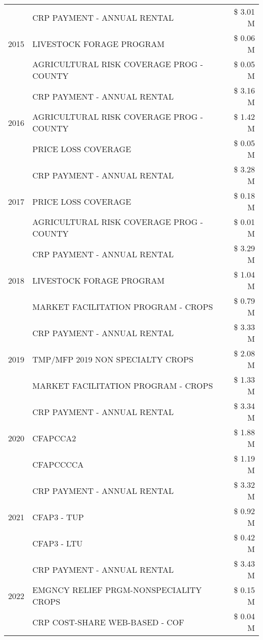 \begin{tabular}{llr}
\cline{1-3}
\multirow[t]{3}{*}{2015} & CRP PAYMENT - ANNUAL RENTAL & \$ 3.01 M \\
 & LIVESTOCK FORAGE PROGRAM & \$ 0.06 M \\
 & AGRICULTURAL RISK COVERAGE PROG - COUNTY & \$ 0.05 M \\
\cline{1-3}
\multirow[t]{3}{*}{2016} & CRP PAYMENT - ANNUAL RENTAL & \$ 3.16 M \\
 & AGRICULTURAL RISK COVERAGE PROG - COUNTY & \$ 1.42 M \\
 & PRICE LOSS COVERAGE & \$ 0.05 M \\
\cline{1-3}
\multirow[t]{3}{*}{2017} & CRP PAYMENT - ANNUAL RENTAL & \$ 3.28 M \\
 & PRICE LOSS COVERAGE & \$ 0.18 M \\
 & AGRICULTURAL RISK COVERAGE PROG - COUNTY & \$ 0.01 M \\
\cline{1-3}
\multirow[t]{3}{*}{2018} & CRP PAYMENT - ANNUAL RENTAL & \$ 3.29 M \\
 & LIVESTOCK FORAGE PROGRAM & \$ 1.04 M \\
 & MARKET FACILITATION PROGRAM - CROPS & \$ 0.79 M \\
\cline{1-3}
\multirow[t]{3}{*}{2019} & CRP PAYMENT - ANNUAL RENTAL & \$ 3.33 M \\
 & TMP/MFP 2019 NON SPECIALTY CROPS & \$ 2.08 M \\
 & MARKET FACILITATION PROGRAM - CROPS & \$ 1.33 M \\
\cline{1-3}
\multirow[t]{3}{*}{2020} & CRP PAYMENT - ANNUAL RENTAL & \$ 3.34 M \\
 & CFAPCCA2 & \$ 1.88 M \\
 & CFAPCCCCA & \$ 1.19 M \\
\cline{1-3}
\multirow[t]{3}{*}{2021} & CRP PAYMENT - ANNUAL RENTAL & \$ 3.32 M \\
 & CFAP3 - TUP & \$ 0.92 M \\
 & CFAP3 - LTU & \$ 0.42 M \\
\cline{1-3}
\multirow[t]{3}{*}{2022} & CRP PAYMENT - ANNUAL RENTAL & \$ 3.43 M \\
 & EMGNCY RELIEF PRGM-NONSPECIALITY CROPS & \$ 0.15 M \\
 & CRP COST-SHARE WEB-BASED - COF & \$ 0.04 M \\
\cline{1-3}
\bottomrule
\end{tabular}
